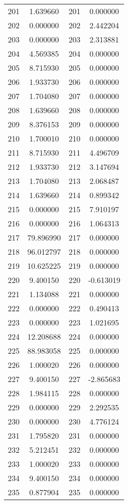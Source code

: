 \documentclass[12pt]{article}
\begin{document}
\begin{longtable}{@{}cccc@{}}
201 & 1.639660 & 201 & 0.000000 \\
202 & 0.000000 & 202 & 2.442204 \\
203 & 0.000000 & 203 & 2.313881 \\
204 & 4.569385 & 204 & 0.000000 \\
205 & 8.715930 & 205 & 0.000000 \\
206 & 1.933730 & 206 & 0.000000 \\
207 & 1.704080 & 207 & 0.000000 \\
208 & 1.639660 & 208 & 0.000000 \\
209 & 8.376153 & 209 & 0.000000 \\
210 & 1.700010 & 210 & 0.000000 \\
211 & 8.715930 & 211 & 4.496709 \\
212 & 1.933730 & 212 & 3.147694 \\
213 & 1.704080 & 213 & 2.068487 \\
214 & 1.639660 & 214 & 0.899342 \\
215 & 0.000000 & 215 & 7.910197 \\
216 & 0.000000 & 216 & 1.064313 \\
217 & 79.896990 & 217 & 0.000000 \\
218 & 96.012797 & 218 & 0.000000 \\
219 & 10.625225 & 219 & 0.000000 \\
220 & 9.400150 & 220 & -0.613019 \\
221 & 1.134088 & 221 & 0.000000 \\
222 & 0.000000 & 222 & 0.490413 \\
223 & 0.000000 & 223 & 1.021695 \\
224 & 12.208688 & 224 & 0.000000 \\
225 & 88.983058 & 225 & 0.000000 \\
226 & 1.000020 & 226 & 0.000000 \\
227 & 9.400150 & 227 & -2.865683 \\
228 & 1.984115 & 228 & 0.000000 \\
229 & 0.000000 & 229 & 2.292535 \\
230 & 0.000000 & 230 & 4.776124 \\
231 & 1.795820 & 231 & 0.000000 \\
232 & 5.212451 & 232 & 0.000000 \\
233 & 1.000020 & 233 & 0.000000 \\
234 & 9.400150 & 234 & 0.000000 \\
235 & 0.877904 & 235 & 0.000000 \\

\end{longtable}
\end{document}
